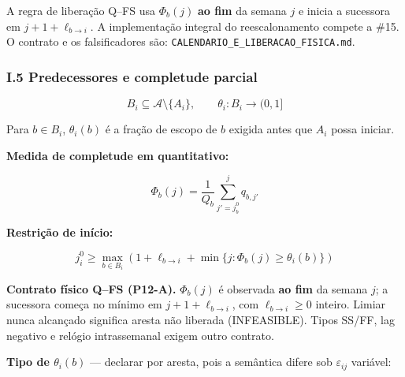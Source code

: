 \documentclass[
  10pt,
]{article}
\begin{document}
A regra de liberação Q--FS usa \(\Phi_b(j)\) \textbf{ao fim} da
semana \(j\) e inicia a sucessora em \(j+1+\ell_{b\to i}\).
A implementação integral do reescalonamento compete a \#15.
O contrato e os falsificadores são:
\texttt{CALENDARIO\_E\_LIBERACAO\_FISICA.md}.

\hypertarget{i.5-predecessores-e-completude-parcial}{%
\subsubsection{I.5 Predecessores e completude
parcial}\label{i.5-predecessores-e-completude-parcial}}

\[B_i \subseteq \mathcal{A}\setminus\{A_i\}, \qquad \theta_i : B_i \to (0,1]\]

Para \(b\in B_i\), \(\theta_i(b)\) é a fração de escopo de \(b\) exigida
antes que \(A_i\) possa iniciar.

\textbf{Medida de completude em quantitativo:}

\[\Phi_b(j) = \frac{1}{Q_b}\sum_{j'=j_b^0}^{j} q_{b,j'}\]

\textbf{Restrição de início:}

\[\boxed{j_i^0 \ge \max_{b\in B_i}
\left(1+\ell_{b\to i}+\min\{j:\Phi_b(j)\ge\theta_i(b)\}\right)}\]

\noindent\textbf{Contrato físico Q--FS (P12-A).} \(\Phi_b(j)\)
é observada \textbf{ao fim} da semana \(j\); a sucessora
começa no mínimo em \(j+1+\ell_{b\to i}\), com
\(\ell_{b\to i}\ge0\) inteiro. Limiar nunca alcançado
significa aresta não liberada (INFEASIBLE).
Tipos SS/FF, lag negativo e relógio intrassemanal exigem outro contrato.

\textbf{Tipo de \(\theta_i(b)\)} --- declarar por aresta, pois a
semântica difere sob \(\varepsilon_{ij}\) variável:
\end{document}
